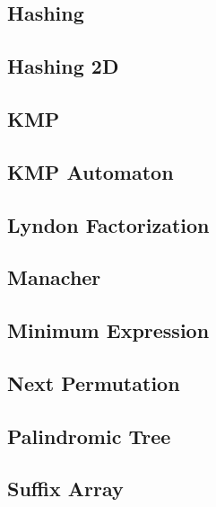 \subsection{Hashing}
\raggedbottom
\hrulefill
\subsection{Hashing 2D}
\raggedbottom
\hrulefill
\subsection{KMP}
\raggedbottom
\hrulefill
\subsection{KMP Automaton}
\raggedbottom
\hrulefill
\subsection{Lyndon Factorization}
\raggedbottom
\hrulefill
\subsection{Manacher}
\raggedbottom
\hrulefill
\subsection{Minimum Expression}
\raggedbottom
\hrulefill
\subsection{Next Permutation}
\raggedbottom
\hrulefill
\subsection{Palindromic Tree}
\raggedbottom
\hrulefill
\subsection{Suffix Array}
\raggedbottom
\hrulefill
